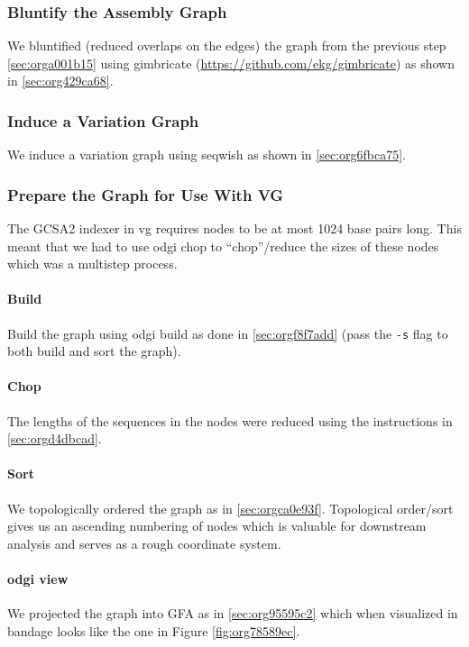 \documentclass[10pt, a4paper]{article}
\begin{document}
\subsubsection{Bluntify the Assembly Graph}
\label{sec:org5750454}
We bluntified (reduced overlaps on the edges) the graph 
\cite{gargGraphbasedApproachDiploid2018} from the previous step
\ref{sec:orga001b15} using gimbricate
(\url{https://github.com/ekg/gimbricate}) as shown in \ref{sec:org429ca68}.

\subsubsection{Induce a Variation Graph}
\label{sec:org17d356b}
We induce a variation graph using seqwish as shown in \ref{sec:org6fbca75}.

\subsubsection{Prepare the Graph for Use With VG}
\label{sec:org7630914}
The GCSA2  indexer in vg requires nodes to be at
most 1024 base pairs long.
This meant that we had to use odgi chop to “chop”/reduce the sizes of these
nodes which was a multistep process.

\paragraph{Build}
\label{sec:orgc86157a}
Build the graph using odgi build as done in \ref{sec:orgf8f7add}
(pass the \texttt{-s} flag to both build and sort the graph).

\paragraph{Chop}
\label{sec:org1bc5521}
The lengths of the sequences in the nodes were reduced using the instructions in
\ref{sec:orgd4dbcad}.

\paragraph{Sort}
\label{sec:org68740b3}
We topologically ordered the graph as in \ref{sec:orgca0e93f}.
Topological order/sort gives us an ascending numbering of nodes which is 
valuable for downstream analysis and serves as a rough coordinate system.

\paragraph{odgi view}
\label{sec:org7c8244d}
We projected the graph into GFA as in \ref{sec:org95595c2} which when visualized in
bandage looks like the one in Figure \ref{fig:org78589ec}.
\end{document}
